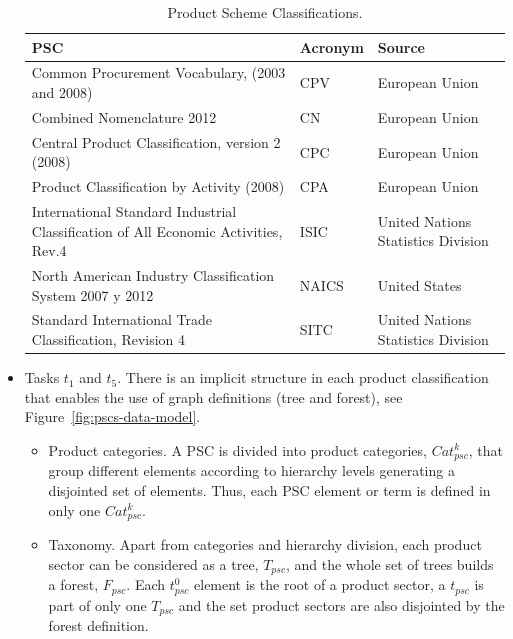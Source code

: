 \begin{itemize}
\begin{table}[!ht]
\renewcommand{\arraystretch}{1.3}
\begin{center}
\begin{tabular}[c]{|p{6cm}|l|p{6cm}|} 
\hline
  \textbf{PSC} &  \textbf{Acronym} & \textbf{Source} \\\hline
  Common Procurement Vocabulary, (2003 and 2008) & CPV & European Union \\ \hline
  Combined Nomenclature 2012 & CN & European Union \\ \hline
  Central Product Classification, version 2 (2008) & CPC & European Union \\ \hline
  Product Classification by Activity (2008) & CPA & European Union \\ \hline
  International Standard Industrial Classification of All Economic Activities, Rev.4 & ISIC & United Nations Statistics Division \\ \hline
  North American Industry Classification System 2007 y 2012 & NAICS & United States \\ \hline
  Standard International Trade Classification, Revision 4 & SITC & United Nations Statistics Division \\ \hline
\hline
\end{tabular}
\caption{Product Scheme Classifications.}\label{table:pscs-ld}
  \end{center}
\end{table} 

 \item Tasks $t_1$ and $t_5$. There is an implicit structure in each product classification 
 that enables the use of graph definitions (tree and forest), see Figure~\ref{fig:pscs-data-model}.
 \begin{itemize}
  \item Product categories. A PSC is divided into product categories, $Cat^k_{psc}$, that group different elements according to 
  hierarchy levels generating a disjointed set of elements. Thus, each PSC element or term is defined in only one $Cat^k_{psc}$.
  \item Taxonomy. Apart from categories and hierarchy division, each product sector can be considered as a tree, $T_{psc}$, 
  and the whole set of trees builds a forest, $F_{psc}$. Each $t^0_{psc}$ element is the root of a product sector, a $t_{psc}$ 
  is part of only one $T_{psc}$ and the set product sectors are also disjointed by the forest definition.
 \end{itemize}
 

\end{itemize}
